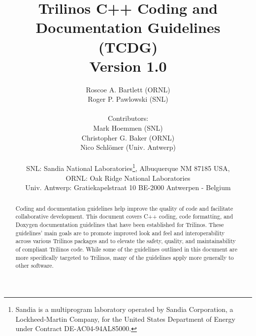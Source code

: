 \documentclass[pdf,11pt]{SANDreport}
\title{\center
Trilinos C++ Coding and \\ Documentation Guidelines \\[2ex] (TCDG)
\\[2ex] Version 1.0 }
\author{
%
Roscoe A. Bartlett (ORNL) \\
Roger P. Pawlowski (SNL) \\ \\
%
Contributors: \\
%
Mark Hoemmen (SNL) \\
Christopher G. Baker (ORNL) \\
Nico Schl\"{o}mer (Univ. Antwerp) \\ \\
%
SNL: Sandia National Laboratories\footnote{Sandia is a multiprogram
laboratory operated by Sandia Corporation, a Lockheed-Martin Company,
for the United States Department of Energy under Contract
DE-AC04-94AL85000.}, Albuquerque NM 87185 USA, \\
%
ORNL: Oak Ridge National Laboratories \\
%
Univ. Antwerp: Gratiekapelstraat 10 BE-2000 Antwerpen - Belgium }
\date{}
\begin{document}

\maketitle

%

%
\begin{abstract}
%
Coding and documentation guidelines help improve the quality of code
and facilitate collaborative development.  This document covers C++
coding, code formatting, and Doxygen documentation guidelines that
have been established for Trilinos.  These guidelines' main goals are
to promote improved look and feel and interoperability across various
Trilinos packages and to elevate the safety, quality, and
maintainability of compliant Trilinos code.  While some of the
guidelines outlined in this document are more specifically targeted to
Trilinos, many of the guidelines apply more generally to other
software.
%
\end{abstract}
%

%
%
%

%
\clearpage
\tableofcontents

\end{document}

